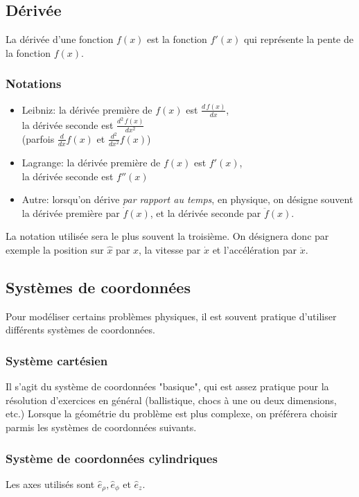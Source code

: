 \documentclass{article}
\numberwithin{equation}{section}
\begin{document}
\subsection{Dérivée}
La dérivée d'une fonction \(f(x)\) est la fonction \(f'(x)\) qui représente la pente de la fonction \(f(x)\).
\subsubsection{Notations}
\begin{itemize}
	\item Leibniz: la dérivée première de \(f(x)\) est \(\frac{d\,f(x)}{dx}\), \\
		la dérivée seconde est \(\frac{d^2\,f(x)}{dx^2}\) \\
		(parfois \(\frac{d}{dx}f(x)\) et \(\frac{d^2}{dx^2}f(x)\))
	\item Lagrange: la dérivée première de \(f(x)\) est \(f'(x)\), \\
		la dérivée seconde est \(f''(x)\)
	\item Autre: lorsqu'on dérive \emph{par rapport au temps}, en physique, on désigne souvent la dérivée première par \(\dot f(x)\), et la dérivée seconde par \(\ddot f(x)\).
\end{itemize}

La notation utilisée sera le plus souvent la troisième. On désignera donc par exemple la position sur \(\hat x\) par \(x\), la vitesse par \(\dot x\) et l'accélération par \(\ddot x\).

\subsection{Systèmes de coordonnées}
Pour modéliser certains problèmes physiques, il est souvent pratique d'utiliser différents systèmes de coordonnées.

\subsubsection{Système cartésien}
Il s'agit du système de coordonnées "basique", qui est assez pratique pour la résolution d'exercices en général (ballistique, chocs à une ou deux dimensions, etc.) Lorsque la géométrie du problème est plus complexe, on préférera choisir parmis les systèmes de coordonnées suivants.

\subsubsection{Système de coordonnées cylindriques}
Les axes utilisés sont \(\hat e_\rho, \hat e_\phi\) et \(\hat e_z\). \\
\end{document}
